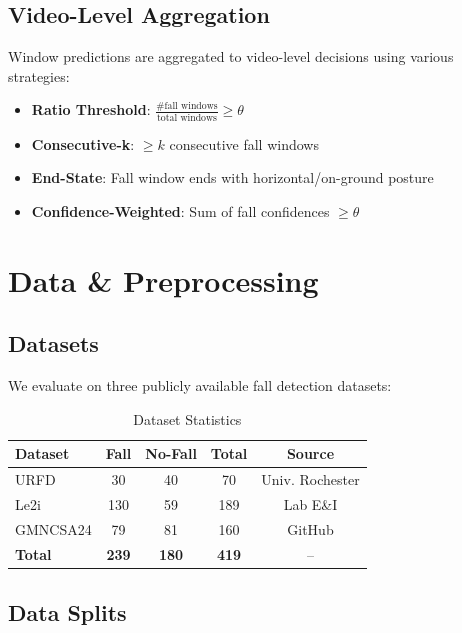 \documentclass[conference]{IEEEtran}
\begin{document}
\subsection{Video-Level Aggregation}

Window predictions are aggregated to video-level decisions using various strategies:

\begin{itemize}
    \item \textbf{Ratio Threshold}: $\frac{\text{\# fall windows}}{\text{total windows}} \geq \theta$
    \item \textbf{Consecutive-k}: $\geq k$ consecutive fall windows
    \item \textbf{End-State}: Fall window ends with horizontal/on-ground posture
    \item \textbf{Confidence-Weighted}: Sum of fall confidences $\geq \theta$
\end{itemize}

\section{Data \& Preprocessing}

\subsection{Datasets}

We evaluate on three publicly available fall detection datasets:

\begin{table}[h]
\centering
\caption{Dataset Statistics}
\label{tab:datasets}
\begin{tabular}{lcccc}
\toprule
\textbf{Dataset} & \textbf{Fall} & \textbf{No-Fall} & \textbf{Total} & \textbf{Source} \\
\midrule
URFD & 30 & 40 & 70 & Univ. Rochester \\
Le2i & 130 & 59 & 189 & Lab E\&I \\
GMNCSA24 & 79 & 81 & 160 & GitHub \\
\midrule
\textbf{Total} & \textbf{239} & \textbf{180} & \textbf{419} & -- \\
\bottomrule
\end{tabular}
\end{table}

\subsection{Data Splits}
\end{document}
